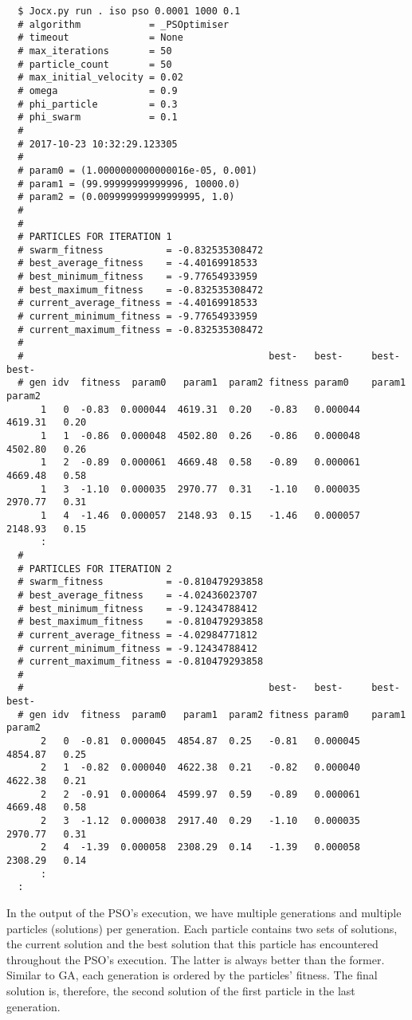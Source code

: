 {\small{}\begin{verbatim}
  $ Jocx.py run . iso pso 0.0001 1000 0.1
  # algorithm            = _PSOptimiser
  # timeout              = None
  # max_iterations       = 50
  # particle_count       = 50
  # max_initial_velocity = 0.02
  # omega                = 0.9
  # phi_particle         = 0.3
  # phi_swarm            = 0.1
  #
  # 2017-10-23 10:32:29.123305
  #
  # param0 = (1.0000000000000016e-05, 0.001)
  # param1 = (99.99999999999996, 10000.0)
  # param2 = (0.009999999999999995, 1.0)
  #
  #
  # PARTICLES FOR ITERATION 1
  # swarm_fitness           = -0.832535308472
  # best_average_fitness    = -4.40169918533
  # best_minimum_fitness    = -9.77654933959
  # best_maximum_fitness    = -0.832535308472
  # current_average_fitness = -4.40169918533
  # current_minimum_fitness = -9.77654933959
  # current_maximum_fitness = -0.832535308472
  #
  #                                           best-   best-     best-     best-
  # gen idv  fitness  param0   param1  param2 fitness param0    param1    param2
      1   0  -0.83  0.000044  4619.31  0.20   -0.83   0.000044  4619.31   0.20
      1   1  -0.86  0.000048  4502.80  0.26   -0.86   0.000048  4502.80   0.26
      1   2  -0.89  0.000061  4669.48  0.58   -0.89   0.000061  4669.48   0.58
      1   3  -1.10  0.000035  2970.77  0.31   -1.10   0.000035  2970.77   0.31
      1   4  -1.46  0.000057  2148.93  0.15   -1.46   0.000057  2148.93   0.15
      :
  #
  # PARTICLES FOR ITERATION 2
  # swarm_fitness           = -0.810479293858
  # best_average_fitness    = -4.02436023707
  # best_minimum_fitness    = -9.12434788412
  # best_maximum_fitness    = -0.810479293858
  # current_average_fitness = -4.02984771812
  # current_minimum_fitness = -9.12434788412
  # current_maximum_fitness = -0.810479293858
  #
  #                                           best-   best-     best-     best-
  # gen idv  fitness  param0   param1  param2 fitness param0    param1    param2
      2   0  -0.81  0.000045  4854.87  0.25   -0.81   0.000045  4854.87   0.25
      2   1  -0.82  0.000040  4622.38  0.21   -0.82   0.000040  4622.38   0.21
      2   2  -0.91  0.000064  4599.97  0.59   -0.89   0.000061  4669.48   0.58
      2   3  -1.12  0.000038  2917.40  0.29   -1.10   0.000035  2970.77   0.31
      2   4  -1.39  0.000058  2308.29  0.14   -1.39   0.000058  2308.29   0.14
      :
  :
\end{verbatim}}

In the output of the PSO’s execution, we have multiple generations and multiple
particles (solutions) per generation. Each particle contains two sets of
solutions, the current solution and the best solution that this particle has
encountered throughout the PSO’s execution. The latter is always better than the
former. Similar to GA, each generation is ordered by the particles’ fitness. The
final solution is, therefore, the second solution of the first particle in the
last generation.
